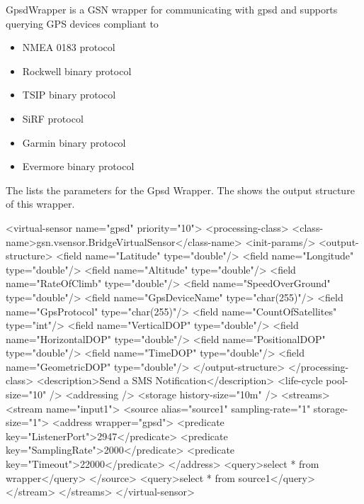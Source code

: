 GpsdWrapper is a GSN wrapper for communicating with gpsd and supports querying GPS devices compliant to

\begin{itemize}
 \item NMEA 0183 protocol
 \item Rockwell binary protocol
 \item TSIP binary protocol
 \item SiRF protocol
 \item Garmin binary protocol
 \item Evermore binary protocol
\end{itemize}


The  lists the parameters for the Gpsd Wrapper. The  shows the output structure of this wrapper.

\begin{xmlcode}[caption={Sample of VSD using the Gpsd Wrapper}, label=listing:xml:gpsd_vsd]
<virtual-sensor name="gpsd" priority="10">
	<processing-class>
		<class-name>gsn.vsensor.BridgeVirtualSensor</class-name>
		<init-params/>
		<output-structure>
			<field name="Latitude" type="double"/>
			<field name="Longitude" type="double"/>
			<field name="Altitude" type="double"/>
			<field name="RateOfClimb" type="double"/>
			<field name="SpeedOverGround" type="double"/>
			<field name="GpsDeviceName" type="char(255)"/>
			<field name="GpsProtocol" type="char(255)"/>
			<field name="CountOfSatellites" type="int"/>
			<field name="VerticalDOP" type="double"/>
			<field name="HorizontalDOP" type="double"/>
			<field name="PositionalDOP" type="double"/>
			<field name="TimeDOP" type="double"/>
			<field name="GeometricDOP" type="double"/>
		</output-structure>
	</processing-class>
	<description>Send a SMS Notification</description>
	<life-cycle pool-size="10" />
	<addressing />
	<storage history-size="10m" />
	<streams>
		<stream name="input1">
			<source alias="source1" sampling-rate="1" storage-size="1">
				<address wrapper="gpsd">
					<predicate key="ListenerPort">2947</predicate>
					<predicate key="SamplingRate">2000</predicate>
					<predicate key="Timeout">22000</predicate>
				</address>
				<query>select * from wrapper</query>
			</source>
			<query>select * from source1</query>
		</stream> 
	</streams>
</virtual-sensor>
\end{xmlcode}
 

